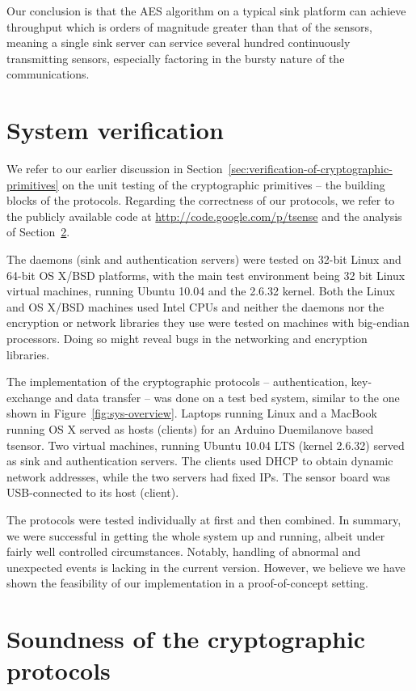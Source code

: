 Our conclusion is that the AES algorithm on a typical sink platform can achieve throughput which is orders of magnitude greater than that of the sensors, meaning a single sink server can service several hundred continuously transmitting sensors, especially factoring in the bursty nature of the communications.

\section{System verification}

We refer to our earlier discussion in Section~\ref{sec:verification-of-cryptographic-primitives} on the unit testing of the cryptographic primitives -- the building blocks of the protocols. Regarding the correctness of our protocols, we refer to the publicly available code at \url{http://code.google.com/p/tsense} and the analysis of Section~\ref{sec:crypto-protocol-analysis}.

The daemons (sink and authentication servers) were tested on 32-bit Linux and 64-bit OS X/BSD platforms, with the main test environment being 32 bit Linux virtual machines, running Ubuntu 10.04 and the 2.6.32 kernel. Both the Linux and OS X/BSD machines used Intel CPUs and neither the daemons nor the encryption or network libraries they use were tested on machines with big-endian processors. Doing so might reveal bugs in the networking and encryption libraries. 

The implementation of the cryptographic protocols -- authentication, key-exchange and data transfer -- was done on a test bed system, similar to the one shown in Figure~\ref{fig:sys-overview}. Laptops running Linux and a MacBook running OS X served as hosts (clients) for an Arduino Duemilanove based tsensor. Two virtual machines, running Ubuntu 10.04 LTS (kernel 2.6.32) served as sink and authentication servers. The clients used DHCP to obtain dynamic network addresses, while the two servers had fixed IPs. The sensor board was USB-connected to its host (client).

The protocols were tested individually at first and then combined. In summary, we were successful in getting the whole system up and running, albeit under fairly well controlled circumstances. Notably, handling of abnormal and unexpected events is lacking in the current version. However, we believe we have shown the feasibility of our implementation in a proof-of-concept setting.

\section{Soundness of the cryptographic protocols}
\label{sec:crypto-protocol-analysis}

